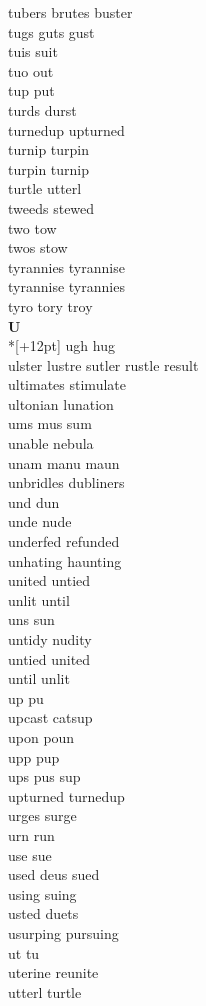tubers brutes buster\\
tugs guts gust\\
tuis suit\\
tuo out\\
tup put\\
turds durst\\
turnedup upturned\\
turnip turpin\\
turpin turnip\\
turtle utterl\\
tweeds stewed\\
two tow\\
twos stow\\
tyrannies tyrannise\\
tyrannise tyrannies\\
tyro tory troy\\

\vspace{14pt}
\noindent\textbf{\Large U}\\*[+12pt]
ugh hug\\
ulster lustre sutler rustle result\\
ultimates stimulate\\
ultonian lunation\\
ums mus sum\\
unable nebula\\
unam manu maun\\
unbridles dubliners\\
und dun\\
unde nude\\
underfed refunded\\
unhating haunting\\
united untied\\
unlit until\\
uns sun\\
untidy nudity\\
untied united\\
until unlit\\
up pu\\
upcast catsup\\
upon poun\\
upp pup\\
ups pus sup\\
upturned turnedup\\
urges surge\\
urn run\\
use sue\\
used deus sued\\
using suing\\
usted duets\\
usurping pursuing\\
ut tu\\
uterine reunite\\
utterl turtle\\

